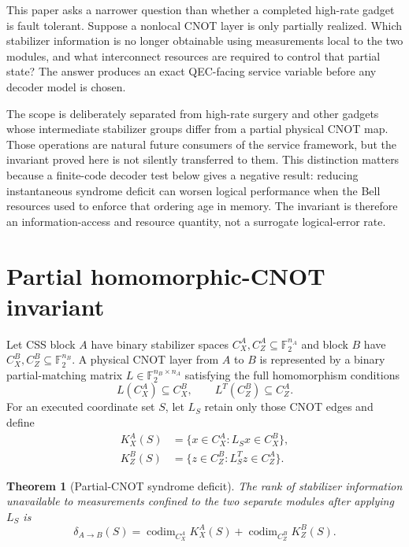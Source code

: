 \documentclass[aps,prx,reprint,superscriptaddress,nofootinbib,longbibliography,floatfix]{revtex4-2}
\newtheorem{theorem}{Theorem}
\newcommand{\F}{\mathbb F_2}\newcommand{\E}{\mathbb E}\newcommand{\Prob}{\mathbb P}
\newcommand{\codim}{\operatorname{codim}}
\begin{document}
This paper asks a narrower question than whether a completed high-rate gadget is fault tolerant. Suppose a nonlocal CNOT layer is only partially realized. Which stabilizer information is no longer obtainable using measurements local to the two modules, and what interconnect resources are required to control that partial state? The answer produces an exact QEC-facing service variable before any decoder model is chosen.

The scope is deliberately separated from high-rate surgery and other gadgets whose intermediate stabilizer groups differ from a partial physical CNOT map. Those operations are natural future consumers of the service framework, but the invariant proved here is not silently transferred to them. This distinction matters because a finite-code decoder test below gives a negative result: reducing instantaneous syndrome deficit can worsen logical performance when the Bell resources used to enforce that ordering age in memory. The invariant is therefore an information-access and resource quantity, not a surrogate logical-error rate.

\section{Partial homomorphic-CNOT invariant}
Let CSS block $A$ have binary stabilizer spaces $C_X^A,C_Z^A\subseteq\F^{n_A}$ and block $B$ have $C_X^B,C_Z^B\subseteq\F^{n_B}$. A physical CNOT layer from $A$ to $B$ is represented by a binary partial-matching matrix $L\in\F^{n_B\times n_A}$ satisfying the full homomorphism conditions
\begin{equation}
L(C_X^A)\subseteq C_X^B,\qquad L^T(C_Z^B)\subseteq C_Z^A.
\end{equation}
For an executed coordinate set $S$, let $L_S$ retain only those CNOT edges and define
\begin{align}
K_X^A(S)&=\{x\in C_X^A:L_Sx\in C_X^B\},\\
K_Z^B(S)&=\{z\in C_Z^B:L_S^Tz\in C_Z^A\}.
\end{align}

\begin{theorem}[Partial-CNOT syndrome deficit]
The rank of stabilizer information unavailable to measurements confined to the two separate modules after applying $L_S$ is
\begin{equation}
\delta_{A\to B}(S)=
\codim_{C_X^A}K_X^A(S)+
\codim_{C_Z^B}K_Z^B(S).
\label{eq:rect}
\end{equation}
\end{theorem}
\end{document}
